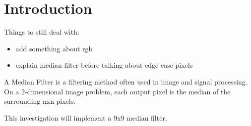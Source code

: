 \section{Introduction}
Things to still deal with:
\begin{itemize}
	\item add something about rgb 
	\item explain median filter before talking about edge case pixels
\end{itemize}
A Median Filter is a filtering method often used in image and signal processing. On a 2-dimensional image problem, each output pixel is the median of the surrounding nxn pixels.

This investigation will implement a 9x9 median filter.

